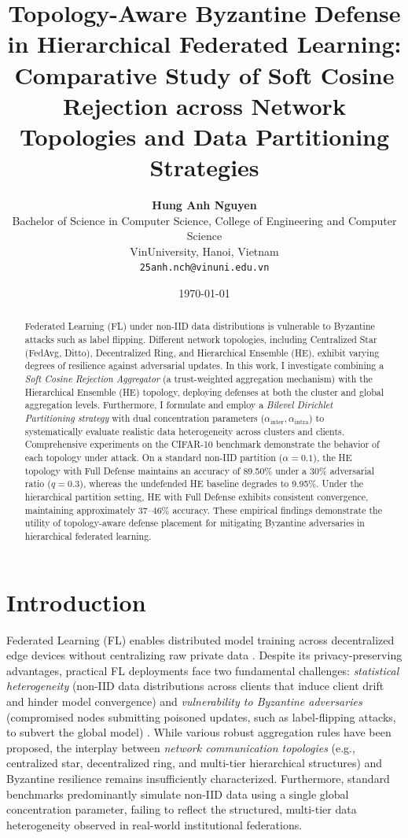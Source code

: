 \documentclass[11pt, a4paper]{article}
\title{\textbf{Topology-Aware Byzantine Defense in Hierarchical Federated Learning: Comparative Study of Soft Cosine Rejection across Network Topologies and Data Partitioning Strategies}}
\author{
    \textbf{Hung Anh Nguyen} \\
    \small Bachelor of Science in Computer Science, College of Engineering and Computer Science \\
    \small VinUniversity, Hanoi, Vietnam \\
    \small \texttt{25anh.nch@vinuni.edu.vn}
}
\date{\today}
\begin{document}
\maketitle

\begin{abstract}
Federated Learning (FL) under non-IID data distributions is vulnerable to Byzantine attacks such as label flipping. Different network topologies, including Centralized Star (FedAvg, Ditto), Decentralized Ring, and Hierarchical Ensemble (HE), exhibit varying degrees of resilience against adversarial updates. In this work, I investigate combining a \textit{Soft Cosine Rejection Aggregator} (a trust-weighted aggregation mechanism) with the Hierarchical Ensemble (HE) topology, deploying defenses at both the cluster and global aggregation levels. Furthermore, I formulate and employ a \textit{Bilevel Dirichlet Partitioning strategy} with dual concentration parameters ($\alpha_{\text{inter}}, \alpha_{\text{intra}}$) to systematically evaluate realistic data heterogeneity across clusters and clients. Comprehensive experiments on the CIFAR-10 benchmark demonstrate the behavior of each topology under attack. On a standard non-IID partition ($\alpha=0.1$), the HE topology with Full Defense maintains an accuracy of 89.50\% under a 30\% adversarial ratio ($q=0.3$), whereas the undefended HE baseline degrades to 9.95\%. Under the hierarchical partition setting, HE with Full Defense exhibits consistent convergence, maintaining approximately 37--46\% accuracy. These empirical findings demonstrate the utility of topology-aware defense placement for mitigating Byzantine adversaries in hierarchical federated learning.
\end{abstract}

\vspace{0.5cm}

\section{Introduction}

Federated Learning (FL) enables distributed model training across decentralized edge devices without centralizing raw private data \cite{mcmahan2017}. Despite its privacy-preserving advantages, practical FL deployments face two fundamental challenges: \textit{statistical heterogeneity} (non-IID data distributions across clients that induce client drift and hinder model convergence) and \textit{vulnerability to Byzantine adversaries} (compromised nodes submitting poisoned updates, such as label-flipping attacks, to subvert the global model) \cite{blanchard2017, zhao2018}. While various robust aggregation rules have been proposed, the interplay between \textit{network communication topologies} (e.g., centralized star, decentralized ring, and multi-tier hierarchical structures) and Byzantine resilience remains insufficiently characterized. Furthermore, standard benchmarks predominantly simulate non-IID data using a single global concentration parameter, failing to reflect the structured, multi-tier data heterogeneity observed in real-world institutional federations.
\end{document}
